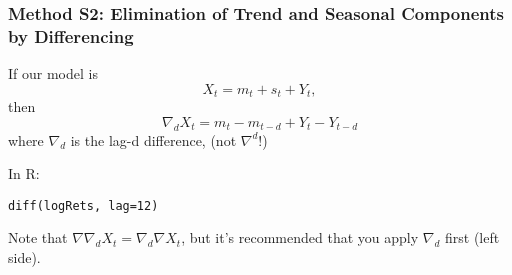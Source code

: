 \documentclass{beamer}
\begin{document}

\begin{frame}[fragile]
\frametitle{Method S2: Elimination of Trend and Seasonal Components
by Differencing}

If our model is 
\[
X_t = m_t + s_t + Y_t,
\]
then
\[
\nabla_d X_t = m_t - m_{t-d} + Y_t - Y_{t-d}
\]
where $\nabla_d$ is the lag-d difference, (not $\nabla^d$!)
\newline

In R:
\begin{verbatim}
diff(logRets, lag=12)
\end{verbatim}

Note that $\nabla \nabla_d X_t = \nabla_d \nabla X_t$, but it's recommended that you apply $\nabla_d$ first (left side).

\end{frame}
\end{document}
